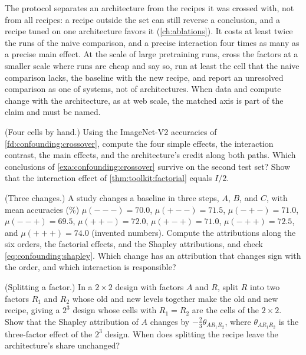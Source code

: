 \begin{refsection}
The protocol separates an architecture from the recipes it was crossed with, not from all recipes: a recipe outside the set can still reverse a conclusion, and a recipe tuned on one architecture favors it (\cref{ch:ablations}). It costs at least twice the runs of the naive comparison, and a precise interaction four times as many as a precise main effect. At the scale of large pretraining runs, cross the factors at a smaller scale where runs are cheap and say so, run at least the cell that the naive comparison lacks, the baseline with the new recipe, and report an unresolved comparison as one of systems, not of architectures. When data and compute change with the architecture, as at web scale, the matched axis is part of the claim and must be named.

\begin{exercises}
\item \consolidation (Four cells by hand.) Using the ImageNet-V2 accuracies of \cref{fd:confounding:crossover}, compute the four simple effects, the interaction contrast, the main effects, and the architecture's credit along both paths. Which conclusions of \cref{exa:confounding:crossover} survive on the second test set? Show that the interaction effect of \cref{thm:toolkit:factorial} equals $I/2$.\label{ex:confounding:v2}

\item \consolidation (Three changes.) A study changes a baseline in three steps, $A$, $B$, and $C$, with mean accuracies (\%) $\mu({-}{-}{-})=70.0$, $\mu({+}{-}{-})=71.5$, $\mu({-}{+}{-})=71.0$, $\mu({-}{-}{+})=69.5$, $\mu({+}{+}{-})=72.0$, $\mu({+}{-}{+})=71.0$, $\mu({-}{+}{+})=72.5$, and $\mu({+}{+}{+})=74.0$ (invented numbers). Compute the attributions along the six orders, the factorial effects, and the Shapley attributions, and check \eqref{eq:confounding:shapley}. Which change has an attribution that changes sign with the order, and which interaction is responsible?\label{ex:confounding:three}

\item \consolidation (Splitting a factor.) In a $2\times2$ design with factors $A$ and $R$, split $R$ into two factors $R_1$ and $R_2$ whose old and new levels together make the old and new recipe, giving a $2^3$ design whose cells with $R_1=R_2$ are the cells of the $2\times2$. Show that the Shapley attribution of $A$ changes by $-\frac23\theta_{AR_1R_2}$, where $\theta_{AR_1R_2}$ is the three-factor effect of the $2^3$ design. When does splitting the recipe leave the architecture's share unchanged? \label{ex:confounding:split}


\end{exercises}
\end{refsection}
